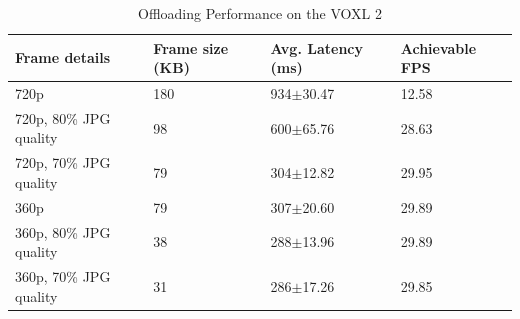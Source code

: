 \begin{table}[htbp]
    \centering
    \begin{tabular}{llll}
        \toprule
        \textbf{Frame details} & \textbf{Frame size (KB)} & \textbf{Avg. Latency (ms)} & \textbf{Achievable FPS}\\
        \midrule
        720p & 180 & 934$\pm$\small{30.47} & 12.58\\
        720p, 80\% JPG quality  & 98 & 600$\pm$\small{65.76} &28.63\\
        720p, 70\% JPG quality & 79 & 304$\pm$\small{12.82} & 29.95\\
        360p & 79 & 307$\pm$\small{20.60}  &29.89 \\
        360p, 80\% JPG quality & 38 &288$\pm$\small{13.96} & 29.89\\
        360p, 70\% JPG quality & 31 & 286$\pm$\small{17.26} & 29.85\\
        \bottomrule
\end{tabular}
\caption{Offloading Performance on the VOXL 2}
\label{tab:voxl2-offload-performance}
\end{table}
